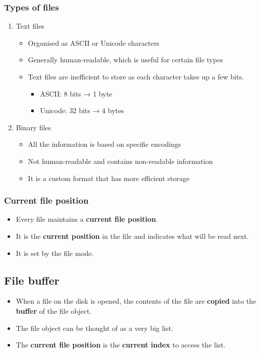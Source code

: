 \documentclass[11pt]{article}
\begin{document}
\subsubsection{Types of files}
\label{sec:orgfdfaa7e}
\begin{enumerate}
\item Text files
\begin{itemize}
\item Organised as ASCII or Unicode characters
\item Generally human-readable, which is useful for certain file types
\item Text files are inefficient to store as each character takes up a few bits.
\begin{itemize}
\item ASCII: 8 bits → 1 byte
\item Unicode: 32 bits → 4 bytes
\end{itemize}
\end{itemize}

\item Binary files
\begin{itemize}
\item All the information is based on specific encodings
\item Not human-readable and contains non-readable information
\item It is a custom format that has more efficient storage
\end{itemize}
\end{enumerate}

\subsubsection{Current file position}
\label{sec:org8d91f0a}
\begin{itemize}
\item Every file maintains a \textbf{current file position}.
\item It is the \textbf{current position} in the file and indicates what will be read next.
\item It is set by the file mode.
\end{itemize}

\subsection{File buffer}
\label{sec:orgb7d3f31}
\begin{itemize}
\item When a file on the disk is opened, the contents of the file are \textbf{copied} into the \textbf{buffer} of the file object.
\item The file object can be thought of as a very big list.
\item The \textbf{current file position} is the \textbf{current index} to access the list.
\end{itemize}
\end{document}
